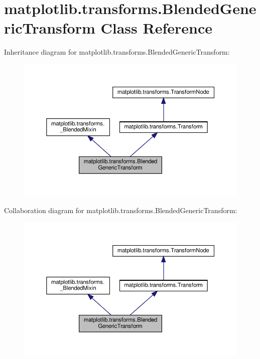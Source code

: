 \hypertarget{classmatplotlib_1_1transforms_1_1BlendedGenericTransform}{}\section{matplotlib.\+transforms.\+Blended\+Generic\+Transform Class Reference}
\label{classmatplotlib_1_1transforms_1_1BlendedGenericTransform}


Inheritance diagram for matplotlib.\+transforms.\+Blended\+Generic\+Transform\+:
\nopagebreak
\begin{figure}[H]
\begin{center}
\leavevmode
\includegraphics[width=350pt]{classmatplotlib_1_1transforms_1_1BlendedGenericTransform__inherit__graph}
\end{center}
\end{figure}


Collaboration diagram for matplotlib.\+transforms.\+Blended\+Generic\+Transform\+:
\nopagebreak
\begin{figure}[H]
\begin{center}
\leavevmode
\includegraphics[width=350pt]{classmatplotlib_1_1transforms_1_1BlendedGenericTransform__coll__graph}
\end{center}
\end{figure}

